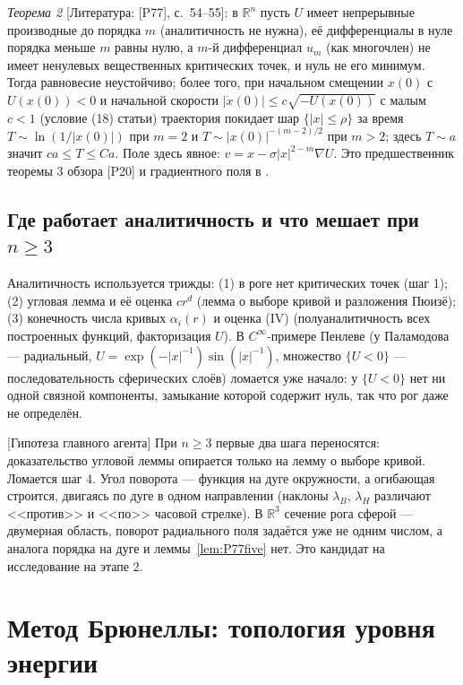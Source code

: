 \documentclass[11pt,a4paper]{article}
\theoremstyle{definition}
\newcommand{\R}{\mathbb R}
\newcommand{\mk}[1]{\textsf{[#1]}}
\begin{document}
\emph{Теорема 2} \mk{Литература: [P77], с.~54--55}: в $\R^n$ пусть $U$ имеет непрерывные
производные до порядка $m$ (аналитичность не нужна), её дифференциалы в нуле порядка меньше $m$
равны нулю, а $m$-й дифференциал $u_m$ (как многочлен) не имеет ненулевых вещественных критических
точек, и нуль не его минимум. Тогда равновесие неустойчиво; более того, при начальном смещении
$x(0)$ с $U(x(0))<0$ и начальной скорости $|\dot x(0)|\le c\sqrt{-U(x(0))}$ с малым $c<1$ (условие (18)
статьи) траектория покидает шар $\{|x|\le\rho\}$ за время $T\sim\ln(1/|x(0)|)$ при $m=2$ и
$T\sim|x(0)|^{-(m-2)/2}$ при $m>2$; здесь $T\sim a$ значит $ca\le T\le Ca$. Поле здесь явное: $v=x-\sigma|x|^{2-m}\nabla U$. Это
предшественник теоремы 3 обзора [P20] и градиентного поля в .

\subsection{Где работает аналитичность и что мешает при $n\ge3$}

Аналитичность используется трижды: (1) в роге нет критических точек (шаг 1); (2) угловая лемма
и её оценка $cr^d$ (лемма о выборе кривой и разложения Пюизё); (3) конечность числа кривых
$\alpha_i(r)$ и оценка (IV) (полуаналитичность всех построенных функций, факторизация $U$). В
$C^\infty$-примере Пенлеве (у Паламодова --- радиальный, $U=\exp(-|x|^{-1})\sin(|x|^{-1})$, множество
$\{U<0\}$ --- последовательность сферических слоёв) ломается уже начало: у $\{U<0\}$ нет ни одной
связной компоненты, замыкание которой содержит нуль, так что рог даже не определён.

\mk{Гипотеза главного агента} При $n\ge3$ первые два шага переносятся: доказательство угловой
леммы опирается только на лемму о выборе кривой. Ломается шаг 4. Угол поворота --- функция на
дуге окружности, а огибающая строится, двигаясь по дуге в одном направлении (наклоны
$\lambda_B$, $\lambda_H$ различают <<против>> и <<по>> часовой стрелке). В $\R^3$ сечение рога сферой ---
двумерная область, поворот радиального поля задаётся уже не одним числом, а аналога порядка на
дуге и леммы~\ref{lem:P77five} нет. Это кандидат на исследование на этапе 2.

\section{Метод Брюнеллы: топология уровня энергии}\label{sec:brunella}
\end{document}
